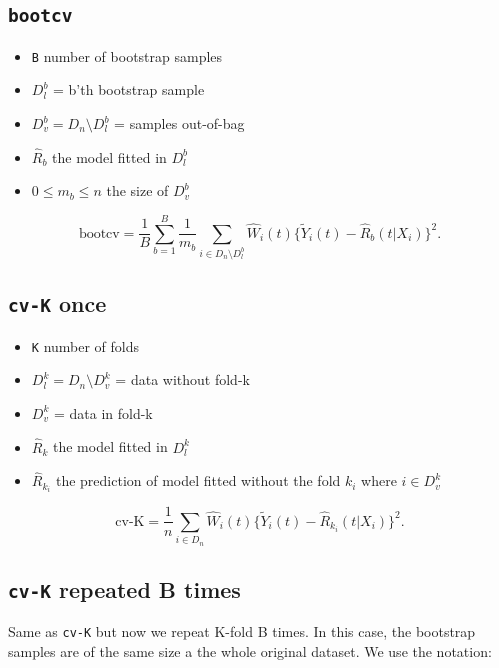 \documentclass{article}
\begin{document}
\subsection{\texttt{bootcv}}
\label{sec:org43397b6}

\begin{itemize}
\item \texttt{B} number of bootstrap samples
\item \(D_l^b\) = b'th bootstrap sample
\item \(D_v^b=D_n \setminus D_l^b\)  = samples out-of-bag
\item \(\hat R_b\) the model fitted in \(D_l^b\)
\item \(0\le m_b \le n\) the size of \(D_v^b\)
\end{itemize}

\begin{equation*}
  \text{bootcv}= \frac 1 B \sum_{b=1}^B\frac{1}{m_b}
  \sum_{i\in D_n\setminus D^b_l}\hat
  W_i(t) \{\tilde Y_i(t)-\hat R_b(t|X_i)\}^2.
\end{equation*}

\subsection{\texttt{cv-K} once}
\label{sec:org93135a0}

\begin{itemize}
\item \texttt{K} number of folds
\item \(D_l^k=D_n \setminus D_v^k\) = data without fold-k
\item \(D_v^k\)  = data in fold-k
\item \(\hat R_k\) the model fitted in \(D_l^k\)
\item \(\hat R_{k_i}\) the prediction of model fitted without the fold \(k_i\) where \(i\in D_v^k\)
\end{itemize}

\begin{equation*}
\text{cv-K}=  \frac{1}{n} \sum_{i\in D_n}
  \hat W_i(t) \{\tilde Y_i(t)-\hat R_{k_i}(t|X_i)\}^2.
\end{equation*}

\subsection{\texttt{cv-K} repeated B times}
\label{sec:org4c46ee2}

Same as \texttt{cv-K} but now we repeat K-fold B times. In this case, the
bootstrap samples are of the same size a the whole original
dataset. We use the notation:
\end{document}
